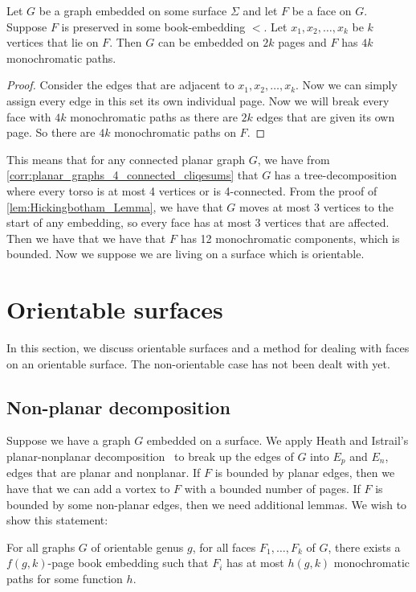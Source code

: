 \begin{theorem}\label{thm:embedded_graph}
	Let \( G \) be a graph embedded on some surface \(\Sigma \) and let \(F\) be a face on \(G\). Suppose \(F \) is preserved in some book-embedding \( < \). Let \(x_1, x_2, \ldots, x_k \) be \(k \) vertices that lie on \(F \). Then $G$ can be embedded on $2k$ pages and \(F\) has \( 4k \) monochromatic paths.
\end{theorem}

\begin{proof}
	Consider the edges that are adjacent to \(x_1, x_2, \ldots, x_k \). Now we can simply assign every edge in this set its own individual page. Now we will break every face with $4k$ monochromatic paths as there are $2k$ edges that are given its own page. So there are $4k$ monochromatic paths on $F$.
\end{proof}

This means that for any connected planar graph \(G \), we have from \cref{corr:planar_graphs_4_connected_cliqesums} that \(G\) has a tree-decomposition where every torso is at most 4 vertices or is 4-connected. From the proof of \cref{lem:Hickingbotham_Lemma}, we have that \(G\) moves at most 3 vertices to the start of any embedding, so every face has at most 3 vertices that are affected. Then we have that we have that \(F \) has 12 monochromatic components, which is bounded. Now we suppose we are living on a surface which is orientable.

\section{Orientable surfaces}
In this section, we discuss orientable surfaces and a method for dealing with faces on an orientable surface. The non-orientable case has not been dealt with yet.
\subsection{Non-planar decomposition}
Suppose we have a graph \(G\) embedded on a surface. We apply Heath and Istrail's planar-nonplanar decomposition~\cite{heathPagenumberGenusGraphs1992} to break up the edges of \(G\) into \(E_p\) and \(E_n\), edges that are planar and nonplanar. If \(F\) is bounded by planar edges, then we have that we can add a vortex to \(F\) with a bounded number of pages. If \(F\) is bounded by some non-planar edges, then we need additional lemmas.
We wish to show this statement:
\begin{theorem}
	For all graphs \(G\) of orientable genus \(g\), for all faces \(F_1, \ldots, F_k\) of \(G\), there exists a \(f(g, k)\)-page book embedding such that \(F_i\) has at most \( h(g, k)\) monochromatic paths for some function $h$.
\end{theorem}

